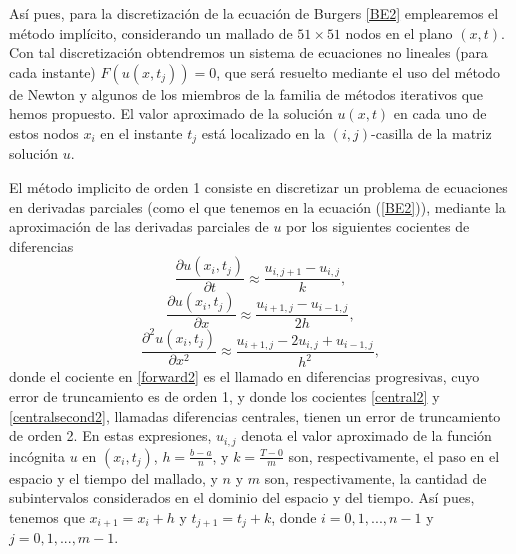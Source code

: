 %

Así pues, para la discretización de la ecuación de Burgers \eqref{BE2} emplearemos el método implícito, considerando un mallado de $51\times 51$ nodos en el plano $(x,t)$. Con tal discretización obtendremos un sistema de ecuaciones no lineales (para cada instante) $F(u(x,t_j))=0$, que será resuelto mediante el uso del método de Newton y algunos de los miembros de la familia de métodos iterativos que hemos propuesto. El valor aproximado de la solución $u(x,t)$ en cada uno de estos nodos $x_i$ en el instante $t_j$ está localizado en la $(i,j)$-casilla de la matriz solución $u$.

El método implicito de orden 1 consiste en discretizar un problema de ecuaciones en derivadas parciales (como el que tenemos en la ecuación (\ref{BE2})), mediante la aproximación de las derivadas parciales de $u$ por los siguientes cocientes de diferencias
\begin{equation} \label{forward2}
\frac{\partial u(x_i,t_j)}{\partial t}\approx\frac{u_{i,j+1}-u_{i,j}}{k},
\end{equation}
\begin{equation} \label{central2}
\frac{\partial u(x_i,t_j)}{\partial x}\approx\frac{u_{i+1,j}-u_{i-1,j}}{2h},
\end{equation}
\begin{equation} \label{centralsecond2}
\frac{\partial^2 u(x_i,t_j)}{\partial x^2}\approx\frac{u_{i+1,j}-2u_{i,j}+u_{i-1,j}}{h^2},
\end{equation}
donde el cociente en \eqref{forward2} es el llamado en diferencias progresivas, cuyo error de truncamiento es de orden 1, y donde los cocientes \eqref{central2} y \eqref{centralsecond2}, llamadas diferencias centrales, tienen un error de truncamiento de orden 2. En estas expresiones, $u_{i,j}$ denota el valor aproximado de la función incógnita $u$ en $(x_i,t_j)$, $h=\frac{b-a}{n}$, y $k=\frac{T-0}{m}$ son, respectivamente, el paso en el espacio y el tiempo del mallado, y $n$ y $m$ son, respectivamente, la cantidad de subintervalos considerados en el dominio del espacio y del tiempo. Así pues, tenemos que $x_{i+1}=x_i+h$ y $t_{j+1}=t_j+k$, donde $i=0,1,...,n-1$ y
$j=0,1,...,m-1$.

